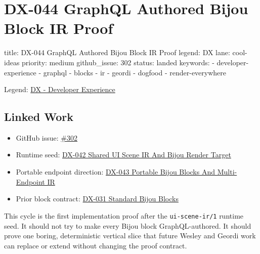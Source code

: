 \chapter{DX-044 GraphQL Authored Bijou Block IR Proof}\label{record-140}

\smallskip

\begin{RecordMeta}
title: DX-044 GraphQL Authored Bijou Block IR Proof
legend: DX
lane: cool-ideas
priority: medium
github_issue: 302
status: landed
keywords:
  - developer-experience
  - graphql
  - blocks
  - ir
  - geordi
  - dogfood
  - render-everywhere

\end{RecordMeta}

Legend: \href{https://github.com/flyingrobots/bijou/blob/1853ad902f6bf219326409e7f743a5a1d6517dbc/docs/legends/DX-developer-experience.md}{DX - Developer Experience}

\section{Linked Work}\label{record-140-linked-work}

\begin{itemize}
\tightlist
\item
  GitHub issue: \href{https://github.com/flyingrobots/bijou/issues/302}{\#302}
\item
  Runtime seed: \href{https://github.com/flyingrobots/bijou/blob/cbd70612140e7a450d764b3c7be1c6af878b99bc/docs/design/DX-042-shared-ui-scene-ir-and-bijou-render-target.md}{DX-042 Shared UI Scene IR And Bijou Render Target}
\item
  Portable endpoint direction: \href{https://github.com/flyingrobots/bijou/blob/cbd70612140e7a450d764b3c7be1c6af878b99bc/docs/design/DX-043-portable-bijou-blocks-and-multi-endpoint-ir.md}{DX-043 Portable Bijou Blocks And Multi-Endpoint IR}
\item
  Prior block contract: \href{https://github.com/flyingrobots/bijou/blob/cbd70612140e7a450d764b3c7be1c6af878b99bc/docs/design/DX-031-standard-bijou-blocks.md}{DX-031 Standard Bijou Blocks}
\end{itemize}

This cycle is the first implementation proof after the \texttt{u\allowbreak{}i\allowbreak{}-\allowbreak{}s\allowbreak{}c\allowbreak{}e\allowbreak{}n\allowbreak{}e\allowbreak{}-\allowbreak{}i\allowbreak{}r\allowbreak{}/\allowbreak{}1} runtime seed. It should not try to make every Bijou block GraphQL-authored. It should prove one boring, deterministic vertical slice that future Wesley and Geordi work can replace or extend without changing the proof contract.

